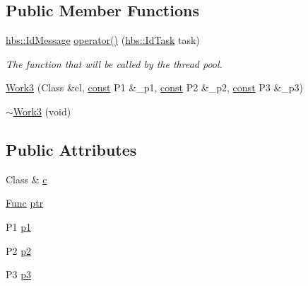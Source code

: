 \subsection*{Public Member Functions}
\begin{DoxyCompactItemize}
\item 
\hyperlink{namespacehbs_a6d744a52db9bca0a9752a009118641f4}{hbs\-::\-Id\-Message} \hyperlink{structhbs_1_1_work_spec_1_1_work3_aae08bdf7dfb3167f8ca748eca40212f7}{operator()} (\hyperlink{namespacehbs_aab8d06205ac2b0b14186327fd6c1c0d6}{hbs\-::\-Id\-Task} task)
\begin{DoxyCompactList}\small\item\em The function that will be called by the thread pool. \end{DoxyCompactList}\item 
\hyperlink{structhbs_1_1_work_spec_1_1_work3_afbd5911248572e66718f881fd433e736}{Work3} (Class \&cl, \hyperlink{term__entry_8h_a57bd63ce7f9a353488880e3de6692d5a}{const} P1 \&\-\_\-p1, \hyperlink{term__entry_8h_a57bd63ce7f9a353488880e3de6692d5a}{const} P2 \&\-\_\-p2, \hyperlink{term__entry_8h_a57bd63ce7f9a353488880e3de6692d5a}{const} P3 \&\-\_\-p3)
\item 
\hyperlink{structhbs_1_1_work_spec_1_1_work3_a71c018e4aa7a4385f53c94e56dc7a12f}{$\sim$\-Work3} (void)
\end{DoxyCompactItemize}
\subsection*{Public Attributes}
\begin{DoxyCompactItemize}
\item 
Class \& \hyperlink{structhbs_1_1_work_spec_1_1_work3_a1d5b33a2f2595b05d790f54409819c33}{c}
\item 
\hyperlink{structhbs_1_1_work_spec_1_1_work3_ac7ae1afe6f16d96d1832caaf6bd4a3d1}{Func} \hyperlink{structhbs_1_1_work_spec_1_1_work3_ace83c17c48096a7a402dc27d39419e73}{ptr}
\item 
P1 \hyperlink{structhbs_1_1_work_spec_1_1_work3_a0aaf6242c8e5e3a3db4a36b71eb160a2}{p1}
\item 
P2 \hyperlink{structhbs_1_1_work_spec_1_1_work3_a413cb2596ad3a67b8cce794e552e073b}{p2}
\item 
P3 \hyperlink{structhbs_1_1_work_spec_1_1_work3_a45be68e8c2138f0af59cbb3da42b9ea3}{p3}
\end{DoxyCompactItemize}


